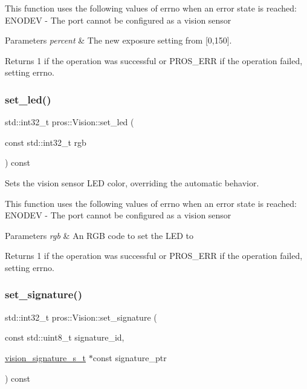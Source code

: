 This function uses the following values of errno when an error state is reached\+: E\+N\+O\+D\+EV -\/ The port cannot be configured as a vision sensor


\begin{DoxyParams}{Parameters}
{\em percent} & The new exposure setting from \mbox{[}0,150\mbox{]}.\\
\hline
\end{DoxyParams}
\begin{DoxyReturn}{Returns}
1 if the operation was successful or P\+R\+O\+S\+\_\+\+E\+RR if the operation failed, setting errno. 
\end{DoxyReturn}
\mbox{\label{classpros_1_1Vision_ada3f1fdd2cc24c15af26bdd7c17bf604}} 
\subsubsection{\texorpdfstring{set\+\_\+led()}{set\_led()}}
{\footnotesize\ttfamily std\+::int32\+\_\+t pros\+::\+Vision\+::set\+\_\+led (\begin{DoxyParamCaption}\item[{const std\+::int32\+\_\+t}]{rgb }\end{DoxyParamCaption}) const}

Sets the vision sensor L\+ED color, overriding the automatic behavior.

This function uses the following values of errno when an error state is reached\+: E\+N\+O\+D\+EV -\/ The port cannot be configured as a vision sensor


\begin{DoxyParams}{Parameters}
{\em rgb} & An R\+GB code to set the L\+ED to\\
\hline
\end{DoxyParams}
\begin{DoxyReturn}{Returns}
1 if the operation was successful or P\+R\+O\+S\+\_\+\+E\+RR if the operation failed, setting errno. 
\end{DoxyReturn}
\mbox{\label{classpros_1_1Vision_a71c3c083ad5538a544e377ebc510cb75}} 
\subsubsection{\texorpdfstring{set\+\_\+signature()}{set\_signature()}}
{\footnotesize\ttfamily std\+::int32\+\_\+t pros\+::\+Vision\+::set\+\_\+signature (\begin{DoxyParamCaption}\item[{const std\+::uint8\+\_\+t}]{signature\+\_\+id,  }\item[{\hyperlink{vision_8h_a135c729c7277f6cc019c2924088a5fd5}{vision\+\_\+signature\+\_\+s\+\_\+t} $\ast$const}]{signature\+\_\+ptr }\end{DoxyParamCaption}) const}

